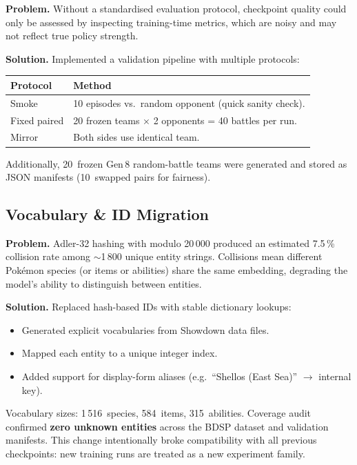 \textbf{Problem.} Without a standardised evaluation protocol, checkpoint
quality could only be assessed by inspecting training-time metrics, which are
noisy and may not reflect true policy strength.

\textbf{Solution.} Implemented a validation pipeline with multiple protocols:

\begin{center}
\small
\begin{tabularx}{\textwidth}{l X}
  \toprule
  \textbf{Protocol} & \textbf{Method} \\
  \midrule
  Smoke        & 10 episodes vs.\ random opponent (quick sanity check). \\
  Fixed paired & 20 frozen teams $\times$ 2 opponents = 40 battles per run. \\
  Mirror       & Both sides use identical team. \\
  \bottomrule
\end{tabularx}
\end{center}

Additionally, 20~frozen Gen\,8 random-battle teams were generated and stored
as JSON manifests (10~swapped pairs for fairness).

\subsection{Vocabulary \& ID Migration}

\textbf{Problem.} Adler-32 hashing with modulo 20\,000 produced an estimated
7.5\,\% collision rate among $\sim$1\,800 unique entity strings.  Collisions
mean different Pok\'{e}mon species (or items or abilities) share the same
embedding, degrading the model's ability to distinguish between entities.

\textbf{Solution.} Replaced hash-based IDs with stable dictionary lookups:

\begin{itemize}
  \item Generated explicit vocabularies from Showdown data files.
  \item Mapped each entity to a unique integer index.
  \item Added support for display-form aliases (e.g.\ ``Shellos (East Sea)''
        $\to$ internal key).
\end{itemize}

Vocabulary sizes: 1\,516~species, 584~items, 315~abilities.
Coverage audit confirmed \textbf{zero unknown entities} across the BDSP
dataset and validation manifests.  This change intentionally broke
compatibility with all previous checkpoints: new training runs are treated as
a new experiment family.

